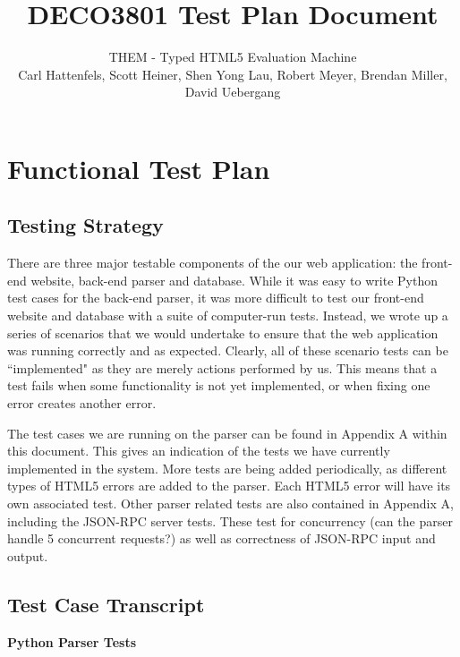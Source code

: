 \documentclass[10pt]{article}
\title{\bf DECO3801 Test Plan Document}
\author{\normalsize THEM - Typed HTML5 Evaluation Machine \\ \normalsize Carl Hattenfels, Scott Heiner, Shen Yong Lau, Robert Meyer, Brendan Miller, David Uebergang}
\date{}
\begin{document}
\maketitle

\section*{Functional Test Plan}

\subsection*{Testing Strategy}

There are three major testable components of the our web application: the front-end website, back-end parser and database. While it was easy to write Python test cases for the back-end parser, it was more difficult to test our front-end website and database with a suite of computer-run tests. Instead, we wrote up a series of scenarios that we would undertake to ensure that the web application was running correctly and as expected. Clearly, all of these scenario tests can be ``implemented" as they are merely actions performed by us. This means that a test fails when some functionality is not yet implemented, or when fixing one error creates another error.

The test cases we are running on the parser can be found in Appendix A within this document. This gives an indication of the tests we have currently implemented in the system. More tests are being added periodically, as different types of HTML5 errors are added to the parser. Each HTML5 error will have its own associated test. Other parser related tests are also contained in Appendix A, including the JSON-RPC server tests. These test for concurrency (can the parser handle 5 concurrent requests?) as well as correctness of JSON-RPC input and output.

\subsection*{Test Case Transcript}

{\bf Python Parser Tests}
\end{document}

